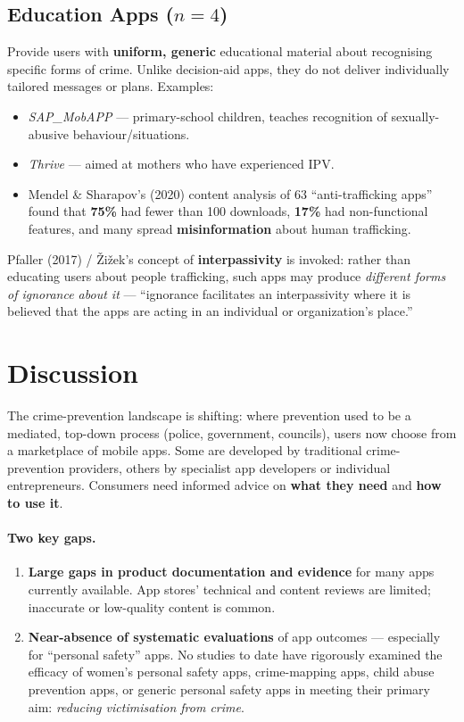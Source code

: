 \documentclass[11pt,a4paper,openany]{report}
\theoremstyle{definition}
\theoremstyle{plain}
\theoremstyle{remark}
\begin{document}
\subsection{Education Apps ($n = 4$)}

Provide users with \textbf{uniform, generic} educational material about recognising specific forms of crime. Unlike decision-aid apps, they do not deliver individually tailored messages or plans. Examples:
\begin{itemize}
    \item \textit{SAP\_MobAPP} --- primary-school children, teaches recognition of sexually-abusive behaviour/situations.
    \item \textit{Thrive} --- aimed at mothers who have experienced IPV.
    \item Mendel \& Sharapov's (2020) content analysis of 63 ``anti-trafficking apps'' found that \textbf{75\%} had fewer than 100 downloads, \textbf{17\%} had non-functional features, and many spread \textbf{misinformation} about human trafficking.
\end{itemize}

\begin{keypoint}
Pfaller (2017) / \v{Z}i\v{z}ek's concept of \textbf{interpassivity} is invoked: rather than educating users about people trafficking, such apps may produce \textit{different forms of ignorance about it} --- ``ignorance facilitates an interpassivity where it is believed that the apps are acting in an individual or organization's place.''
\end{keypoint}

\section{Discussion}

The crime-prevention landscape is shifting: where prevention used to be a mediated, top-down process (police, government, councils), users now choose from a marketplace of mobile apps. Some are developed by traditional crime-prevention providers, others by specialist app developers or individual entrepreneurs. Consumers need informed advice on \textbf{what they need} and \textbf{how to use it}.

\paragraph{Two key gaps.}
\begin{enumerate}
    \item \textbf{Large gaps in product documentation and evidence} for many apps currently available. App stores' technical and content reviews are limited; inaccurate or low-quality content is common.
    \item \textbf{Near-absence of systematic evaluations} of app outcomes --- especially for ``personal safety'' apps. No studies to date have rigorously examined the efficacy of women's personal safety apps, crime-mapping apps, child abuse prevention apps, or generic personal safety apps in meeting their primary aim: \textit{reducing victimisation from crime}.
\end{enumerate}
\end{document}
